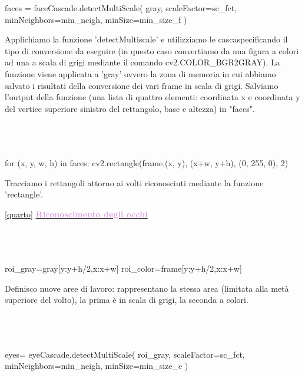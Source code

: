\documentclass[12pt]{article}
\begin{document}
{\begin{codice}
    faces = faceCascade.detectMultiScale(       
        gray,
        scaleFactor=sc_fct,
        minNeighbors=min_neigh,
        minSize=min_size_f
        )
\end{codice}
\vspace{1cm}
  
  	Applichiamo la funzione 'detectMultiscale' e utilizziamo le cascaspecificando il tipo di conversione da eseguire (in questo caso convertiamo da una figura a colori ad una a scala di grigi mediante il comando cv2.COLOR\_BGR2GRAY). La funzione viene applicata a 'gray' ovvero la zona di memoria in cui abbiamo salvato i risultati della conversione dei vari frame in scala di grigi. Salviamo l'output della funzione (una lista di quattro elementi: coordinata x e coordinata y del vertice superiore sinistro del rettangolo, base e altezza) in "faces".
  	\\
  	\\
  	\\
  	\\
 \begin{codice}
    for (x, y, w, h) in faces:
            cv2.rectangle(frame,(x, y), (x+w, y+h), (0, 255, 0), 2)
\end{codice}
\vspace{1cm}
	  
	  Tracciamo i rettangoli attorno ai volti riconosciuti mediante la funzione 'rectangle'.
\vspace{1.5cm}	  	
  	
\ref {quarto} \underline{\textbf{\textcolor{Plum}{Riconoscimento degli occhi}}}
  	\\
  	\\
  	\\
  	\\ 
 \begin{codice}
            roi_gray=gray[y:y+h/2,x:x+w]
            roi_color=frame[y:y+h/2,x:x+w]

\end{codice}
\vspace{1cm}
 
    Definisco nuove aree di lavoro: rappresentano la stessa area (limitata alla metà superiore del volto), la prima è in scala di grigi, la seconda a colori.
    \\
    \\
    \\
    \\
 \begin{codice}
             eyes= eyeCascade.detectMultiScale(         
                 roi_gray,
                 scaleFactor=sc_fct,
                 minNeighbors=min_neigh,
                 minSize=min_size_e
                 )  
 \end{codice}
\vspace{1cm}
  
}
\end{document}

